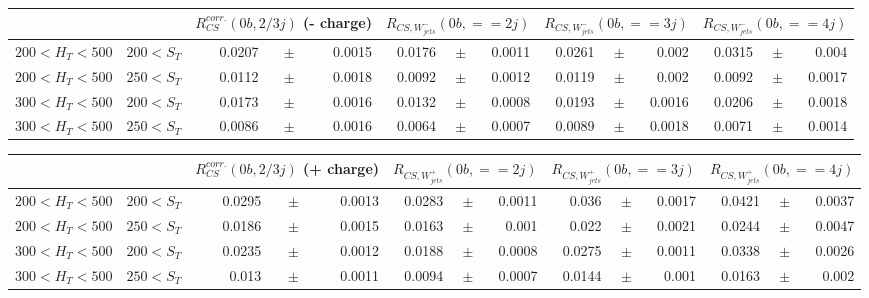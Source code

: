 \documentclass[12pt]{paper}
\begin{document}
\begin{sidewaystable}[ht]
\begin{center}
\begin{tabular}{cc|rrr|rrr|rrr|rrr}
& & \multicolumn{3}{c|}{$R^{corr.}_{CS}(0b,2/3j)$ (- charge)}&\multicolumn{3}{c|}{$R_{CS,W^{-}_{jets}}(0b,==2j)$}&\multicolumn{3}{c}{$R_{CS,W^{-}_{jets}}(0b,==3j)$}&\multicolumn{3}{c}{$R_{CS,W^{-}_{jets}}(0b,==4j)$}\\\hline
$200< H_{T}< 500$&$200< S_{T}$ & 0.0207&$\pm$&0.0015 & 0.0176&$\pm$&0.0011 & 0.0261&$\pm$&0.002 & 0.0315&$\pm$&0.004\\
$200< H_{T}< 500$&$250< S_{T}$ & 0.0112&$\pm$&0.0018 & 0.0092&$\pm$&0.0012 & 0.0119&$\pm$&0.002 & 0.0092&$\pm$&0.0017\\
$300< H_{T}< 500$&$200< S_{T}$ & 0.0173&$\pm$&0.0016 & 0.0132&$\pm$&0.0008 & 0.0193&$\pm$&0.0016 & 0.0206&$\pm$&0.0018\\
$300< H_{T}< 500$&$250< S_{T}$ & 0.0086&$\pm$&0.0016 & 0.0064&$\pm$&0.0007 & 0.0089&$\pm$&0.0018 & 0.0071&$\pm$&0.0014\\
\end{tabular}
\end{center}
\end{sidewaystable}

\begin{sidewaystable}[ht]
\begin{center}
\begin{tabular}{cc|rrr|rrr|rrr|rrr}
& & \multicolumn{3}{c|}{$R^{corr.}_{CS}(0b,2/3j)$ (+ charge)}&\multicolumn{3}{c|}{$R_{CS,W^{+}_{jets}}(0b,==2j)$}&\multicolumn{3}{c|}{$R_{CS,W^{+}_{jets}}(0b,==3j)$}&\multicolumn{3}{c}{$R_{CS,W^{+}_{jets}}(0b,==4j)$}\\\hline
$200< H_{T}< 500$&$200< S_{T}$ & 0.0295&$\pm$&0.0013 & 0.0283&$\pm$&0.0011 & 0.036&$\pm$&0.0017 & 0.0421&$\pm$&0.0037\\
$200< H_{T}< 500$&$250< S_{T}$ & 0.0186&$\pm$&0.0015 & 0.0163&$\pm$&0.001 & 0.022&$\pm$&0.0021 & 0.0244&$\pm$&0.0047\\
$300< H_{T}< 500$&$200< S_{T}$ & 0.0235&$\pm$&0.0012 & 0.0188&$\pm$&0.0008 & 0.0275&$\pm$&0.0011 & 0.0338&$\pm$&0.0026\\
$300< H_{T}< 500$&$250< S_{T}$ & 0.013&$\pm$&0.0011 & 0.0094&$\pm$&0.0007 & 0.0144&$\pm$&0.001 & 0.0163&$\pm$&0.002\\
\end{tabular}
\end{center}
\end{sidewaystable}
\end{document}
